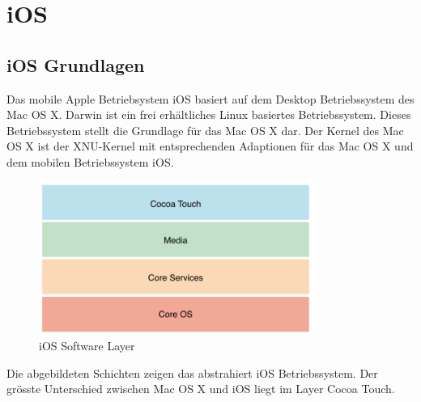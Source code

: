 %
%
% 
% 
% 


\chapter{iOS}
\label{chap:iOS}

\section{iOS Grundlagen}
\label{sec:iOSGrundlage}

Das mobile Apple Betriebsystem iOS basiert auf dem Desktop Betriebssystem des Mac OS X. Darwin ist ein frei erhältliches Linux basiertes Betriebssystem. Dieses Betriebssystem stellt die Grundlage für das Mac OS X dar. Der Kernel des Mac OS X ist der XNU-Kernel mit entsprechenden Adaptionen für das Mac OS X und dem mobilen Betriebssystem iOS.
\begin{figure}[htbp]
        \centering
                \includegraphics[height=5cm]{Bilder/Chapter3_SystemArchitektur}
        \caption{iOS Software Layer\cite{Apple[6]} }
        	\label{fig:iOS Software Layer}
\end{figure}
Die abgebildeten Schichten zeigen das abstrahiert iOS Betriebssystem. Der grösste Unterschied zwischen Mac OS X und iOS liegt im Layer Cocoa Touch.


